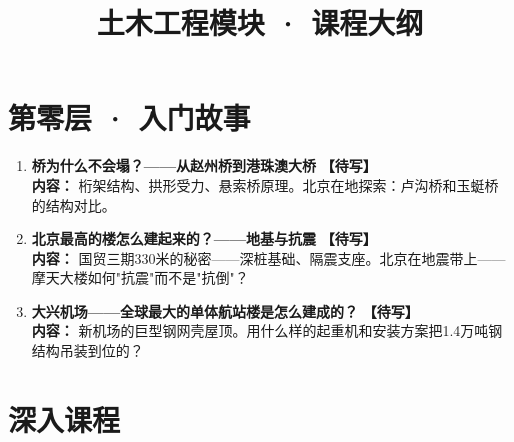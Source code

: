 \documentclass[a4paper,11pt]{ctexart}
\title{\textcolor{blue!70!black}{\Huge\textbf{土木工程模块 · 课程大纲}}}
\author{}
\date{}
\newcommand{\draft}{\textcolor{orange!80!black}{\textbf{【待写】}}}
\begin{document}
\maketitle
\thispagestyle{empty}

\section*{第零层 · 入门故事}

\begin{enumerate}
\item[\textbf{第1课}] \textbf{桥为什么不会塌？——从赵州桥到港珠澳大桥} \draft \\
\textbf{内容：} 桁架结构、拱形受力、悬索桥原理。北京在地探索：卢沟桥和玉蜓桥的结构对比。
\item[\textbf{第2课}] \textbf{北京最高的楼怎么建起来的？——地基与抗震} \draft \\
\textbf{内容：} 国贸三期330米的秘密——深桩基础、隔震支座。北京在地震带上——摩天大楼如何"抗震"而不是"抗倒"？
\item[\textbf{第3课}] \textbf{大兴机场——全球最大的单体航站楼是怎么建成的？} \draft \\
\textbf{内容：} 新机场的巨型钢网壳屋顶。用什么样的起重机和安装方案把1.4万吨钢结构吊装到位的？
\end{enumerate}

\section*{深入课程}
\end{document}

